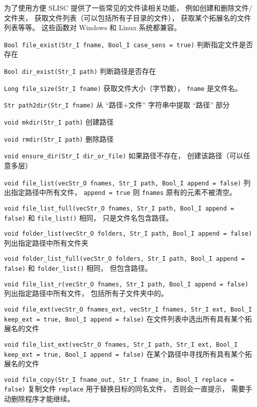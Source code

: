 
\begin{issues}
\issueDraft
\end{issues}

为了使用方便 SLISC 提供了一些常见的文件读相关功能， 例如创建和删除文件/文件夹， 获取文件列表（可以包括所有子目录的文件）， 获取某个拓展名的文件列表等等。 这些函数对 Windows 和 Linux 系统都兼容。

\verb`Bool file_exist(Str_I fname, Bool_I case_sens = true)` 判断指定文件是否存在

\verb`Bool dir_exist(Str_I path)` 判断路径是否存在

\verb`Long file_size(Str_I fname)` 获取文件大小（字节数）， \verb`fname` 是文件名。

\verb`Str path2dir(Str_I fname)` 从 “路径+文件” 字符串中提取 “路径” 部分

\verb`void mkdir(Str_I path)` 创建路径

\verb`void rmdir(Str_I path)` 删除路径

\verb`void ensure_dir(Str_I dir_or_file)` 如果路径不存在， 创建该路径（可以任意多层）

\verb`void file_list(vecStr_O fnames, Str_I path, Bool_I append = false)` 列出指定路径中所有文件， \verb`append = true` 则 \verb`fnames` 原有的元素不被清空。

\verb`void file_list_full(vecStr_O fnames, Str_I path, Bool_I append = false)` 和 \verb`file_list()` 相同， 只是文件名包含路径。

\verb`void folder_list(vecStr_O folders, Str_I path, Bool_I append = false)` 列出指定路径中所有文件夹

\verb`void folder_list_full(vecStr_O folders, Str_I path, Bool_I append = false)` 和 \verb`folder_list()` 相同， 但包含路径。

\verb`void file_list_r(vecStr_O fnames, Str_I path, Bool_I append = false)` 列出指定路径中所有文件， 包括所有子文件夹中的。

\verb`void file_ext(vecStr_O fnames_ext, vecStr_I fnames, Str_I ext, Bool_I keep_ext = true, Bool_I append = false)` 在文件列表中选出所有具有某个拓展名的文件

\verb`void file_list_ext(vecStr_O fnames, Str_I path, Str_I ext, Bool_I keep_ext = true, Bool_I append = false)` 在某个路径中寻找所有具有某个拓展名的文件

\verb`void file_copy(Str_I fname_out, Str_I fname_in, Bool_I replace = false)` 复制文件 \verb`replace` 用于替换目标的同名文件， 否则会一直提示， 需要手动删除程序才能继续。


